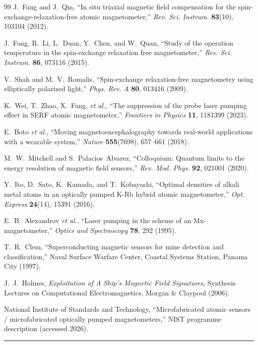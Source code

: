 \documentclass[11pt]{article}
\newcommand{\band}{\begin{center}\rule{\linewidth}{0.8pt}\end{center}}
\begin{document}
\begin{thebibliography}{99}
 J.~Fang and J.~Qin, ``In situ triaxial magnetic field
compensation for the spin-exchange-relaxation-free atomic magnetometer,''
\emph{Rev. Sci. Instrum.} \textbf{83}(10), 103104 (2012).

 J.~Fang, R.~Li, L.~Duan, Y.~Chen, and W.~Quan, ``Study of the
operation temperature in the spin-exchange relaxation free magnetometer,''
\emph{Rev. Sci. Instrum.} \textbf{86}, 073116 (2015).

 V.~Shah and M.~V.~Romalis, ``Spin-exchange relaxation-free
magnetometry using elliptically polarized light,'' \emph{Phys. Rev. A}
\textbf{80}, 013416 (2009).

 K.~Wei, T.~Zhao, X.~Fang, \emph{et al.}, ``The suppression of
the probe laser pumping effect in SERF atomic magnetometer,'' \emph{Frontiers in
Physics} \textbf{11}, 1181399 (2023).

 E.~Boto \emph{et al.}, ``Moving magnetoencephalography towards
real-world applications with a wearable system,'' \emph{Nature} \textbf{555}(7698),
657--661 (2018).

 M.~W.~Mitchell and S.~Palacios~Alvarez, ``Colloquium:
Quantum limits to the energy resolution of magnetic field sensors,'' \emph{Rev.
Mod. Phys.} \textbf{92}, 021001 (2020).

 Y.~Ito, D.~Sato, K.~Kamada, and T.~Kobayashi, ``Optimal
densities of alkali metal atoms in an optically pumped K-Rb hybrid atomic
magnetometer,'' \emph{Opt. Express} \textbf{24}(14), 15391 (2016).

 E.~B.~Alexandrov \emph{et al.}, ``Laser pumping in the
scheme of an Mx-magnetometer,'' \emph{Optics and Spectroscopy} \textbf{78}, 292
(1995).

 T.~R.~Clem, ``Superconducting magnetic sensors for mine
detection and classification,'' Naval Surface Warfare Center, Coastal Systems
Station, Panama City (1997).

 J.~J.~Holmes, \emph{Exploitation of A Ship's Magnetic Field
Signatures}, Synthesis Lectures on Computational Electromagnetics, Morgan \&
Claypool (2006).

 National Institute of Standards and Technology,
``Microfabricated atomic sensors / microfabricated optically pumped
magnetometers,'' NIST programme description (accessed 2026).
\end{thebibliography}

\vfill
\band
\end{document}
